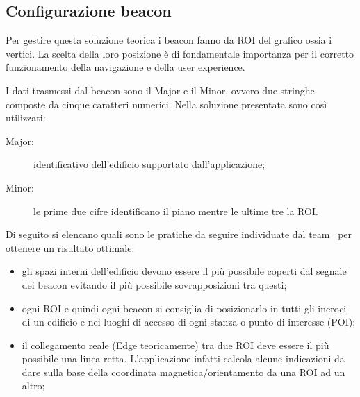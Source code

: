 \documentclass[../ManualeSviluppatore.tex]{subfiles}
\begin{document}
		
	\subsection{Configurazione beacon}
		Per gestire questa soluzione teorica i beacon fanno da ROI del grafico ossia i vertici. La scelta della loro posizione è di fondamentale importanza per il corretto funzionamento della navigazione e della user experience. 

		I dati trasmessi dal \gls{beacon} sono il Major e il Minor, ovvero due stringhe composte da cinque caratteri numerici. Nella soluzione presentata sono così utilizzati:
		\begin{description}
			\item[Major:] identificativo dell'edificio supportato dall'applicazione;
			\item[Minor:] le prime due cifre identificano il piano mentre le ultime tre la ROI.
		\end{description}			
		
		Di seguito si elencano quali sono le pratiche da seguire individuate dal team \leaf\ per ottenere un risultato ottimale:
		\begin{itemize}
			\item gli spazi interni dell'edificio devono essere il più possibile coperti dal segnale dei \gls{beacon} evitando il più possibile sovrapposizioni tra questi;
			\item ogni ROI e quindi ogni \gls{beacon} si consiglia di posizionarlo in tutti gli incroci di un edificio e nei luoghi di accesso di ogni stanza o punto di interesse (POI);
			\item il collegamento reale (Edge teoricamente) tra due ROI deve essere il più possibile una linea retta. L'applicazione infatti calcola alcune indicazioni da dare sulla base della coordinata magnetica/orientamento da una ROI ad un altro;
		\end{itemize}
\end{document}

